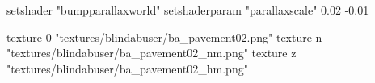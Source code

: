 	setshader "bumpparallaxworld"
	setshaderparam "parallaxscale" 0.02 -0.01

		texture 0 "textures/blindabuser/ba_pavement02.png"
		texture n "textures/blindabuser/ba_pavement02_nm.png"
		texture z "textures/blindabuser/ba_pavement02_hm.png"
